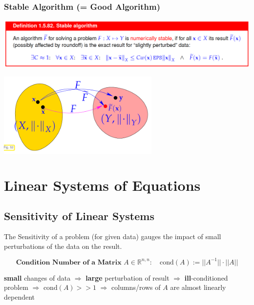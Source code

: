 \documentclass[12pt, a4paper]{article}
\newcommand{\R}{\mathbb{R}}
\begin{document}
\subsubsection{Stable Algorithm (= Good Algorithm)}
\begin{center}
	 \includegraphics[width=1.0\textwidth]{stable_algorithm1.png}
\end{center}

\begin{center}
	 \includegraphics[width=0.6\textwidth]{stable_algorithm2.png}
\end{center}

\newpage
\section{Linear Systems of Equations}

\subsection{Sensitivity of Linear Systems}

The Sensitivity of a problem (for given data) gauges the impact of small perturbations of the data on the result.

\begin{equation*}
	\textbf{Condition Number of a Matrix } A \in \R^{n,n}:\quad \text{cond}(A) := ||A^{-1}||\cdot||A||
\end{equation*}

\begin{center}
 			\vspace{2mm}
		\textbf{small} changes of data $\Rightarrow$ \textbf{large} perturbation of result $\Rightarrow$ \textbf{ill}-conditioned problem $\Rightarrow$ $\text{cond}(A) >> 1$ $\Rightarrow$ columns/rows of $A$ are almost linearly dependent \\
\end{center}
\end{document}
